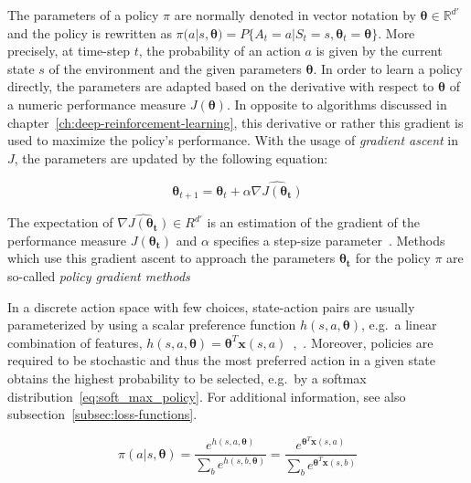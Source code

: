 \documentclass[draft,final]{vutinfth} %
\newcommand{\p}[1]{see p. #1}
\begin{document}
    The parameters of a policy $\pi$ are normally denoted in vector notation by $\boldsymbol{\theta} \in \mathbb{R}^{d'}$ and the policy is rewritten as $\pi(a|s,\boldsymbol{\theta})=P\{A_t=a|S_t=s,\boldsymbol{\theta}_t=\boldsymbol{\theta}\}$.
    More precisely, at time-step $t$, the probability of an action $a$ is given by the current state $s$ of the environment and the given parameters $\boldsymbol{\theta}$.
    In order to learn a policy directly, the parameters are adapted based on the derivative with respect to $\boldsymbol{\theta}$ of a numeric performance measure $J(\boldsymbol{\theta})$.
    In opposite to algorithms discussed in chapter~\ref{ch:deep-reinforcement-learning}, this derivative or rather this gradient is used to maximize the policy's performance.
    With the usage of \textit{gradient ascent} in $J$, the parameters are updated by the following equation:

    \begin{equation}
        \boldsymbol{\theta}_{t+1}=\boldsymbol{\theta}_{t} + \alpha \widehat{\nabla J(\boldsymbol{\theta_t})}\label{eq:parameter_update}
    \end{equation}

    The expectation of $\widehat{\nabla J(\boldsymbol{\theta_t})} \in R^{d'}$ is an estimation of the gradient of the performance measure $J(\boldsymbol{\theta_t})$ and $\alpha$ specifies a step-size parameter~.
    Methods which use this gradient ascent to approach the parameters $\boldsymbol{\theta_t}$ for the policy $\pi$ are so-called \textit{policy gradient methods}

    In a discrete action space with few choices, state-action pairs are usually parameterized by using a scalar preference function $h(s,a,\boldsymbol{\theta})$, e.g.\ a linear combination of features, $h(s,a,\boldsymbol{\theta})=\boldsymbol{\theta}^T\boldsymbol{x}(s,a)$~\citep[\p{321}]{sutton_reinforcement_2018},~.
    Moreover, policies are required to be stochastic and thus the most preferred action in a given state obtains the highest probability to be selected, e.g.\ by a softmax distribution~\eqref{eq:soft_max_policy}.
    For additional information, see also subsection~\ref{subsec:loss-functions}.

    \begin{equation}
        \pi(a|s,\boldsymbol{\theta})=\frac{e^{h(s,a,\boldsymbol{\theta})}}{\sum_{b}e^{h(s,b,\boldsymbol{\theta})}}=\frac{e^{\boldsymbol{\theta}^T\boldsymbol{x}(s,a)}}{\sum_{b}e^{\boldsymbol{\theta}^T\boldsymbol{x}(s,b)}}\label{eq:soft_max_policy}
    \end{equation}
\end{document}
